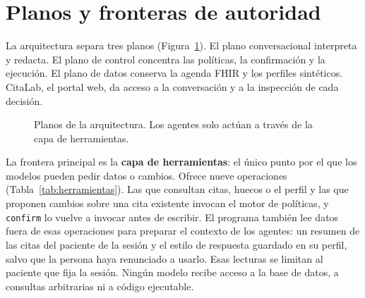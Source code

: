 \section{Planos y fronteras de autoridad}

La arquitectura separa tres planos (Figura~\ref{fig:diseno-arquitectura}). El
plano conversacional interpreta y redacta. El plano de control concentra las
políticas, la confirmación y la ejecución. El plano de datos conserva la agenda
FHIR y los perfiles sintéticos. CitaLab, el portal web, da acceso a la
conversación y a la inspección de cada decisión.

\begin{figure}[!htbp]
\centering
{}
\caption{Planos de la arquitectura. Los agentes solo actúan a través de la capa de herramientas.}
\label{fig:diseno-arquitectura}
\end{figure}

La frontera principal es la \textbf{capa de herramientas}: el único punto por
el que los modelos pueden pedir datos o cambios. Ofrece nueve operaciones
(Tabla~\ref{tab:herramientas}). Las que consultan citas, huecos o el perfil y
las que proponen cambios sobre una cita existente invocan el motor de
políticas, y \texttt{confirm} lo vuelve a invocar antes de escribir. El
programa también lee datos fuera de esas operaciones para preparar el contexto
de los agentes: un resumen de las citas del paciente de la sesión y el estilo
de respuesta guardado en su perfil, salvo que la persona haya renunciado a
usarlo. Esas lecturas se limitan al paciente que fija la sesión. Ningún modelo
recibe acceso a la base de datos, a consultas arbitrarias ni a código
ejecutable.

